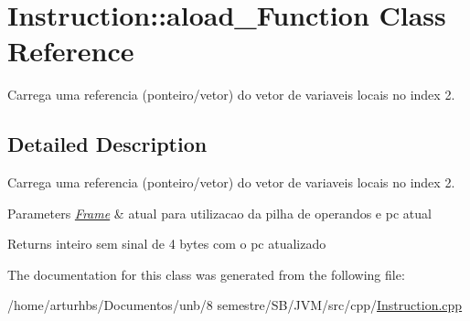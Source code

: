 \hypertarget{classInstruction_1_1aload__2Function}{}\section{Instruction\+:\+:aload\+\_\+Function Class Reference}
\label{classInstruction_1_1aload__2Function}


Carrega uma referencia (ponteiro/vetor) do vetor de variaveis locais no index 2.  




\subsection{Detailed Description}
Carrega uma referencia (ponteiro/vetor) do vetor de variaveis locais no index 2. 


\begin{DoxyParams}{Parameters}
{\em \hyperlink{classFrame}{Frame}} & atual para utilizacao da pilha de operandos e pc atual \\
\hline
\end{DoxyParams}
\begin{DoxyReturn}{Returns}
inteiro sem sinal de 4 bytes com o pc atualizado 
\end{DoxyReturn}


The documentation for this class was generated from the following file\+:\begin{DoxyCompactItemize}
\item 
/home/arturhbs/\+Documentos/unb/8 semestre/\+S\+B/\+J\+V\+M/src/cpp/\hyperlink{Instruction_8cpp}{Instruction.\+cpp}\end{DoxyCompactItemize}
